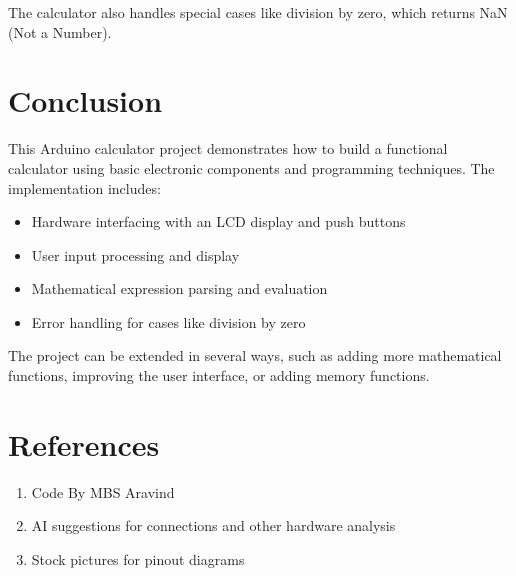 \documentclass{article}
\begin{document}
The calculator also handles special cases like division by zero, which returns NaN (Not a Number).

\section{Conclusion}

This Arduino calculator project demonstrates how to build a functional calculator using basic electronic components and programming techniques. The implementation includes:

\begin{itemize}
    \item Hardware interfacing with an LCD display and push buttons
    \item User input processing and display
    \item Mathematical expression parsing and evaluation
    \item Error handling for cases like division by zero
\end{itemize}

The project can be extended in several ways, such as adding more mathematical functions, improving the user interface, or adding memory functions.
\section{References}
\begin{enumerate}
    \item Code By MBS Aravind
    \item AI suggestions for connections and other hardware analysis
    \item Stock pictures for pinout diagrams
\end{enumerate}
\end{document}
